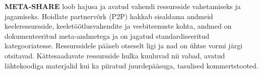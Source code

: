 \documentclass[]{../metanetpaper}
\begin{document}
\begin{multicols}{2}

\textbf{META-SHARE} loob hajusa ja avatud vahendi ressursside vahetamiseks ja jagamiseks. Hoidlate partnervõrk (P2P) hakkab sisaldama andmeid keeleressursside, keeletöötlusvahendite ja veebiteenuste kohta, andmed on dokumenteeritud meta-andmetega ja on jagatud standardiseeritud kategooriatesse. Ressurssidele pääseb otseselt ligi ja nad on ühtse vormi järgi otsitavad. Kättesaadavate ressursside hulka kuuluvad nii vabad, avatud lähtekoodiga materjalid kui ka piiratud juurdepääsuga, tasulised kommertstooted.


\end{multicols}
\end{document}

